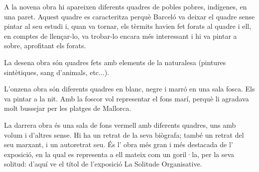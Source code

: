 \begin{news}
A la novena obra hi apareixen diferents quadres de pobles pobres, indígenes, en una paret. Aquest quadre es caracteritza perquè Barceló va deixar el quadre sense pintar al seu estudi i,  quan va tornar, els tèrmits havien fet forats al quadre i ell, en comptes de llençar-lo, va trobar-lo encara més interessant i hi va pintar a sobre, aprofitant els forats.

La desena obra són quadres fets amb elements de la naturalesa (pintures sintètiques, sang d'animals, etc...).

L’onzena obra són diferents quadres en blanc, negre i marró en una sala fosca. Els va pintar a la nit. Amb la foscor vol representar el fons marí, perquè li agradava molt bussejar per les platges de Mallorca.

La darrera obra és una sala de fons vermell amb diferents quadres, uns amb volum i d’altres sense. Hi ha un retrat de la seva biògrafa; també un retrat del seu marxant, i un autoretrat seu. És l’ obra més gran i més destacada de l’ exposició, en la qual es representa a ell mateix com un goril·la, per la seva solitud: d’aquí ve el títol de l’exposició La Solitude Organisative.

\end{news}
